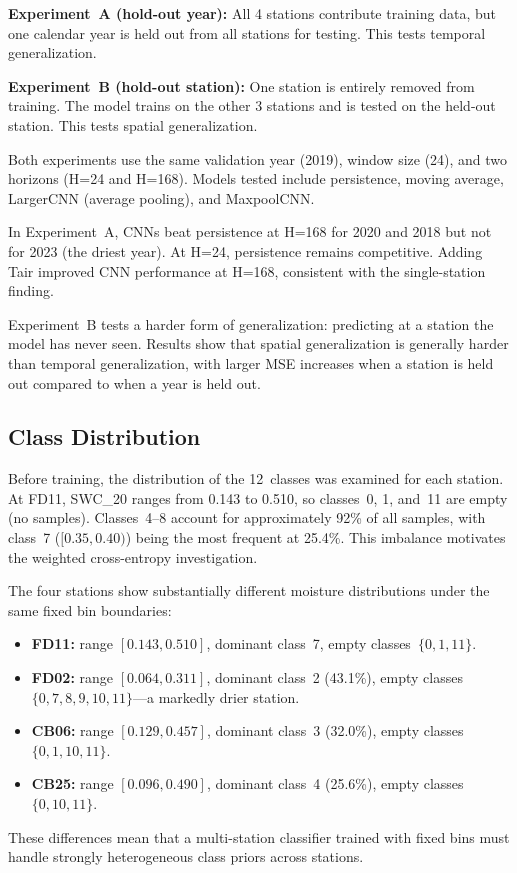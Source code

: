 \documentclass[11pt]{article}
\begin{document}
\textbf{Experiment~A (hold-out year):} All 4 stations contribute training data, but
one calendar year is held out from all stations for testing. This tests temporal
generalization.

\textbf{Experiment~B (hold-out station):} One station is entirely removed from
training. The model trains on the other 3 stations and is tested on the held-out
station. This tests spatial generalization.

Both experiments use the same validation year (2019), window size (24), and two
horizons (H=24 and H=168). Models tested include persistence, moving average,
LargerCNN (average pooling), and MaxpoolCNN.

In Experiment~A, CNNs beat persistence at H=168 for 2020 and 2018 but not for 2023
(the driest year). At H=24, persistence remains competitive. Adding Tair improved CNN
performance at H=168, consistent with the single-station finding.

Experiment~B tests a harder form of generalization: predicting at a station the model
has never seen. Results show that spatial generalization is generally harder than
temporal generalization, with larger MSE increases when a station is held out compared
to when a year is held out.

\subsection{Class Distribution}

Before training, the distribution of the 12~classes was examined for each station.
At FD11, SWC\_20 ranges from 0.143 to 0.510, so classes~0, 1, and~11 are empty
(no samples). Classes~4--8 account for approximately 92\% of all samples, with
class~7 ($[0.35, 0.40)$) being the most frequent at 25.4\%. This imbalance
motivates the weighted cross-entropy investigation.

The four stations show substantially different moisture distributions under the
same fixed bin boundaries:
\begin{itemize}
    \item \textbf{FD11:} range $[0.143, 0.510]$, dominant class~7, empty
    classes~$\{0,1,11\}$.
    \item \textbf{FD02:} range $[0.064, 0.311]$, dominant class~2 (43.1\%), empty
    classes~$\{0,7,8,9,10,11\}$---a markedly drier station.
    \item \textbf{CB06:} range $[0.129, 0.457]$, dominant class~3 (32.0\%), empty
    classes~$\{0,1,10,11\}$.
    \item \textbf{CB25:} range $[0.096, 0.490]$, dominant class~4 (25.6\%), empty
    classes~$\{0,10,11\}$.
\end{itemize}
These differences mean that a multi-station classifier trained with fixed bins
must handle strongly heterogeneous class priors across stations.
\end{document}
